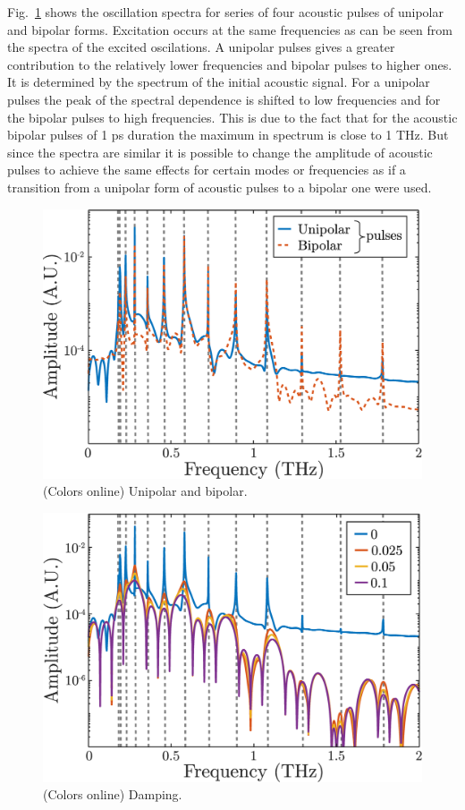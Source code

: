 \documentclass[%
superscriptaddress,
preprint,
showpacs,
amsmath,
amssymb,
aps,
prl,
]{revtex4-1}
\begin{document}
Fig.~\ref{fig:spectrumUniBip} shows the oscillation spectra for series of four acoustic pulses of unipolar and bipolar forms. Excitation occurs at the same frequencies as can be seen from the spectra of the excited oscilations. A unipolar pulses gives a greater contribution to the relatively lower frequencies and bipolar pulses to higher ones. It is determined by the spectrum of the initial acoustic signal. For a unipolar pulses the peak of the spectral dependence is shifted to low frequencies and for the bipolar pulses to high frequencies. This is due to the fact that for the acoustic bipolar pulses of 1 ps duration the maximum in spectrum is close to 1 THz. But since the spectra are similar it is possible to change the amplitude of acoustic pulses to achieve the same effects for certain modes or frequencies as if a transition from a unipolar form of acoustic pulses to a bipolar one were used.
	
\begin{figure}[ht]
	\centering
	\includegraphics[width=0.95\columnwidth]{spectrumLogNorm-Ni_30nm-6_5T-uni_bip-3_57ps-withMode.eps}
	\caption{(Colors online) Unipolar and bipolar.}
	\label{fig:spectrumUniBip}
\end{figure}
	
\begin{figure}[ht]
	\centering
	\includegraphics[width=0.95\columnwidth]{spectrumDampingNormLog-Ni_30nm-6_5T-uni-3_57ps-withMode.eps}
	\caption{(Colors online) Damping.}
	\label{fig:spectrumUniDamping}
\end{figure}
	
\end{document}
